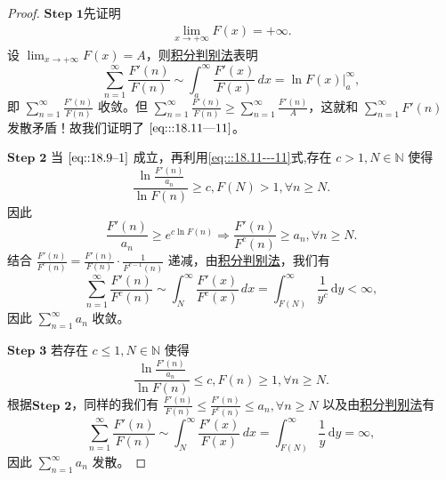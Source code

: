 \documentclass[../../main.tex]{subfiles}
\begin{document}
\begin{proof}
$\mathbf{Step}\,\,\mathbf{1}$先证明
\begin{align}
\lim_{x \to +\infty} F(x) = +\infty. \label{eq:::18.11---11}
\end{align}
设 \(\lim_{x \to +\infty} F(x) = A\)，则\hyperref[theorem:积分判别法]{积分判别法}表明
\[
\sum_{n=1}^\infty \frac{F'(n)}{F(n)} \sim \int_a^\infty \frac{F'(x)}{F(x)} \, dx = \ln F(x) \big|_a^\infty,
\]
即 \(\sum_{n=1}^\infty \frac{F'(n)}{F(n)}\) 收敛。但 \(\sum_{n=1}^\infty \frac{F'(n)}{F(n)} \geqslant \sum_{n=1}^\infty \frac{F'(n)}{A}\)，这就和 \(\sum_{n=1}^\infty F'(n)\) 发散矛盾！故我们证明了 \(\eqref{eq:::18.11---11}\)。

$\mathbf{Step}\,\,\mathbf{2}$ 当 \(\eqref{eq::18.9--1}\) 成立，再利用\eqref{eq:::18.11---11}式,存在 \( c > 1, N \in \mathbb{N} \) 使得
\[
\frac{\ln \frac{F'(n)}{a_n}}{\ln F(n)} \geqslant c,F(N)>1, \forall n \geqslant N.
\]
因此
\[
\frac{F'(n)}{a_n} \geqslant e^{c \ln F(n)} \Rightarrow \frac{F'(n)}{F^c(n)} \geqslant a_n, \forall n \geqslant N.
\]
结合 \(\frac{F'(n)}{F^c(n)} = \frac{F'(n)}{F(n)} \cdot \frac{1}{F^{c - 1}(n)}\) 递减，由\hyperref[theorem:积分判别法]{积分判别法}，我们有
\[
\sum_{n=1}^\infty \frac{F'(n)}{F^c(n)} \sim \int_N^\infty \frac{F'(x)}{F^c(x)} \, dx = \int_{F(N)}^\infty \frac{1}{y^c} \, \mathrm{d}y < \infty,
\]
因此 \(\sum_{n=1}^\infty a_n\) 收敛。

$\mathbf{Step}\,\,\mathbf{3}$ 若存在 \( c \leqslant 1, N \in \mathbb{N} \) 使得
\[
\frac{\ln \frac{F'(n)}{a_n}}{\ln F(n)} \leqslant c, F(n) \geqslant 1, \forall n \geqslant N.
\]
根据$\mathbf{Step}\,\,\mathbf{2}$，同样的我们有 \(\frac{F'(n)}{F(n)} \leqslant \frac{F'(n)}{F^c(n)} \leqslant a_n, \forall n \geqslant N\) 以及由\hyperref[theorem:积分判别法]{积分判别法}有
\[
\sum_{n=1}^\infty \frac{F'(n)}{F(n)} \sim \int_N^\infty \frac{F'(x)}{F(x)} \, dx = \int_{F(N)}^\infty \frac{1}{y} \, \mathrm{d}y = \infty,
\]
因此 \(\sum_{n=1}^\infty a_n\) 发散。
\end{proof}
\end{document}
